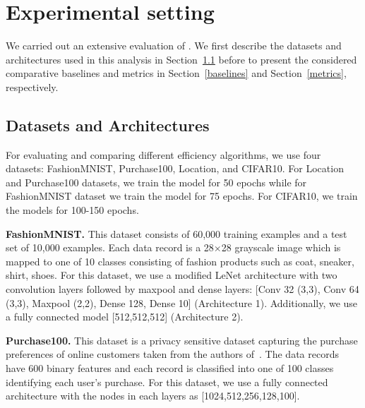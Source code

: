 \section{Experimental setting}
\label{setting}

We carried out an extensive evaluation of \method. %
%
We first describe the datasets and architectures used in this analysis in Section~\ref{datasets} before to present the considered comparative baselines and metrics in Section~\ref{baselines} and Section~\ref{metrics}, respectively. %


\subsection{Datasets and Architectures}
\label{datasets}

For evaluating and comparing different efficiency algorithms, we use four datasets: FashionMNIST, Purchase100, Location, and CIFAR10.
For Location and Purchase100 datasets, we train the model for 50 epochs while for FashionMNIST dataset we train the model for 75 epochs. 
For CIFAR10, we train the models for 100-150 epochs.

\noindent\textbf{FashionMNIST.} This dataset consists of 60,000 training examples and a test set of 10,000 examples.
Each data record is a 28$\times$28 grayscale image which is mapped to one of 10 classes consisting of fashion products such as coat, sneaker, shirt, shoes.
For this dataset, we use a modified LeNet architecture with two convolution layers followed by maxpool and dense layers: [Conv 32 (3,3), Conv 64 (3,3), Maxpool (2,2), Dense 128, Dense 10] (Architecture 1). Additionally, we use a fully connected model [512,512,512] (Architecture 2).

\noindent\textbf{Purchase100.} This dataset is a privacy sensitive dataset capturing the purchase preferences of online customers taken from the authors of~\cite{shokri2017membership}.
The data records have 600 binary features and each record is classified into one of 100 classes identifying each user's purchase.
For this dataset, we use a fully connected architecture with the nodes in each layers as [1024,512,256,128,100].

